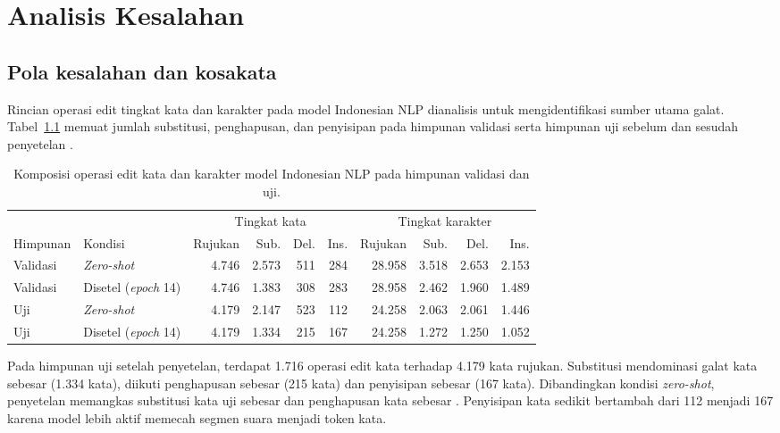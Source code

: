 \chapter{Analisis Kesalahan}
\label{bab:analisis}

\section{Pola kesalahan dan kosakata}

Rincian operasi edit tingkat kata dan karakter pada model Indonesian NLP dianalisis untuk mengidentifikasi sumber utama galat. Tabel~\ref{tab:komposisi-edit} memuat jumlah substitusi, penghapusan, dan penyisipan pada himpunan validasi serta himpunan uji sebelum dan sesudah penyetelan \cite{repoasr}.

\begin{table}[!htbp]
  \centering\small
  \caption{Komposisi operasi edit kata dan karakter model Indonesian NLP pada himpunan validasi dan uji.}
  \label{tab:komposisi-edit}
  \begin{tabular}{@{}llrrrrrrrr@{}}
    \toprule
    & & \multicolumn{4}{c}{Tingkat kata} & \multicolumn{4}{c}{Tingkat karakter} \\
    \cmidrule(lr){3-6}\cmidrule(lr){7-10}
    Himpunan & Kondisi & Rujukan & Sub. & Del. & Ins. & Rujukan & Sub. & Del. & Ins. \\
    \midrule
    Validasi & \textit{Zero-shot} & 4.746 & 2.573 & 511 & 284 & 28.958 & 3.518 & 2.653 & 2.153 \\
    Validasi & Disetel (\textit{epoch} 14) & 4.746 & 1.383 & 308 & 283 & 28.958 & 2.462 & 1.960 & 1.489 \\
    \midrule
    Uji & \textit{Zero-shot} & 4.179 & 2.147 & 523 & 112 & 24.258 & 2.063 & 2.061 & 1.446 \\
    Uji & Disetel (\textit{epoch} 14) & 4.179 & 1.334 & 215 & 167 & 24.258 & 1.272 & 1.250 & 1.052 \\
    \bottomrule
  \end{tabular}
\end{table}

Pada himpunan uji setelah penyetelan, terdapat 1.716 operasi edit kata terhadap 4.179 kata rujukan. Substitusi mendominasi galat kata sebesar  (1.334 kata), diikuti penghapusan sebesar  (215 kata) dan penyisipan sebesar  (167 kata). Dibandingkan kondisi \textit{zero-shot}, penyetelan memangkas substitusi kata uji sebesar  dan penghapusan kata sebesar . Penyisipan kata sedikit bertambah dari 112 menjadi 167 karena model lebih aktif memecah segmen suara menjadi token kata.

